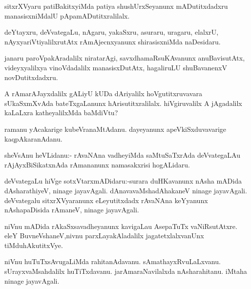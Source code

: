 \documentclass{article}
\begin{document}
\begin{mn}%
sitxrXVyaru patiBakitxyiMda patiya shushUrxSeyanunx mADutitxdadxru manasisxniMdalU 
pApamADutitxralilalx.
\end{mn}

\begin{mn}%
deYtayxru, deVvategaLu, nAgaru, yakaSxru, asuraru, uragaru, elalxrU, 
nAyxyariVtiyalilxrutAtx rAmAjecnxyanunx shirasisxniMda naDesidaru.
\end{mn}

\begin{mn}%
janaru paroVpakAradalilx niratarAgi, savxdhamaRsuKAvanunx anuBavisutAtx, videyxyalilxya 
vinoVdadalilx manasisxDutAtx, hagaliruLU shuBavanenxV novDutitxdadxru.
\end{mn}

\begin{mn}%
A rAmarAJayxdalilx gALiyU kUDa dAriyalilx hoVgutitxruvavara sUkaSxmXvAda bateTxgaLanunx 
hArisutitxralilalx. hiVgiruvalilx A jAgadalilx kaLaLxra katheyalilxMda baMdiVtu?
\end{mn}

\begin{mn}%
ramanu yAcakarige kubeVranaMtAdanu. dayeyanunx apeVkiSxduvavarige kaqpAkaranAdanu.
\end{mn}



\begin{mn}%
sheVsAnu heVLidanu:- rAvaNAna vadheyiMda saMtuSaTxrAda deVvategaLAu rAjAyxBiSikatxnAda 
rAmananunx namasakxrisi hogALidaru.
\end{mn}

\begin{mn}%
deVvategaLu hiVge sotxVtarxmADidaru:-surara duHKavanunx nAsha mADida dAsharathiyeV, ninage 
jayavAgali. dAnavavaMshadAhakaneV ninage jayavAgali. deVvategalu sitxrXVyaranunx 
eLeyutitxdadx rAvaNAna keYyanunx nAshapaDisida rAmaneV, ninage jayavAgali. 
\end{mn}

\begin{mn}%
niVnu mADida rAkaSxsavadheyanunx kavigaLau AsepaTuTx vaNiRsutAtxre. eleY 
BuvneVshaneV,nivnu parxLayakAladalilx jagatetxlalxvanUnx tiMduhAkutitxVye.
\end{mn}

\begin{mn}%
niVnu huTuTxsAvugaLiMda rahitanAdavanu. sAmathayxRvuLaLxvanu. sUrayxvaMsahdalilx 
huTiTxdavanu. jarAmaraNavilalxda nAsharahitanu. iMtaha ninage jayavAgali.
\end{mn}
\end{document}
